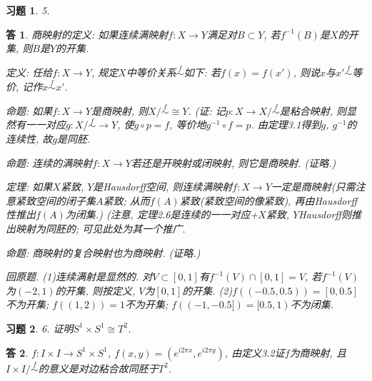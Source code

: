 \documentclass{ctexart}%
\newtheorem*{exercise}{习题}
\newtheorem*{solution}{答}
\theoremstyle{definition}
\theoremstyle{remark}
\begin{document}
\begin{exercise}5.
\end{exercise}
\begin{solution}
商映射的定义: 如果连续满映射$f:X\rightarrow Y$满足对$B\subset Y$, 若$f^{-1}(B)$是$X$的开集, 则$B$是$Y$的开集. 

定义: 任给$f:X\rightarrow Y$, 规定$X$中等价关系$\overset{f}{\sim}$如下: 若$f(x)=f(x')$, 则说$x$与$x'$$\overset{f}{\sim}$等价, 记作$x\overset{f}{\sim} x'$.

命题: 如果$f:X\rightarrow Y$是商映射, 则$X\slash \overset{f}{\sim} \cong Y$. (证: 记$p:X\rightarrow X\slash \overset{f}{\sim}$是粘合映射, 则显然有一一对应$g: X/\overset{f}{\sim}\rightarrow Y$, 使$g\circ p= f$, 等价地$g^{-1}\circ f =p$. 由定理3.1得到$g$, $g^{-1}$的连续性, 故$g$是同胚. 

命题: 连续的满映射$f: X\rightarrow Y$若还是开映射或闭映射, 则它是商映射. (证略.)

定理: 如果$X$紧致, $Y$是Hausdorff空间, 则连续满映射$f: X\rightarrow Y$一定是商映射(只需注意紧致空间的闭子集$A$紧致; 从而$f(A)$紧致(紧致空间的像紧致), 再由Hausdorff性推出$f(A)$为闭集.) (注意, 定理2.6是连续的一一对应+$X$紧致, $Y$Hausdorff则推出映射为同胚的; 可见此处为其一个推广. 

命题: 商映射的复合映射也为商映射. (证略.)

回原题. (1)连续满射是显然的. 对$V\subset [0,1]$有$f^{-1}(V)\cap [0,1]=V$, 若$f^{-1}(V)$为$(-2,1)$的开集, 则按定义, $V$为$[0,1]$的开集. 
(2)$f((-0.5,0.5))=[0,0.5]$不为开集; $f((1,2))=1$不为开集; $f((-1,-0.5])=[0.5,1)$不为闭集. 
\end{solution}

\begin{exercise}6. 证明$S^1\times S^1  \cong T^2$.
\end{exercise}
\begin{solution}$f:I\times I \rightarrow S^1\times S^1$, $f(x,y)=(e^{i 2\pi x},e^{i 2\pi y})$, 由定义3.2证$f$为商映射, 且$I\times I \slash \overset{f}{\sim}$的意义是对边粘合故同胚于$T^2$. 
\end{solution}
\end{document}
